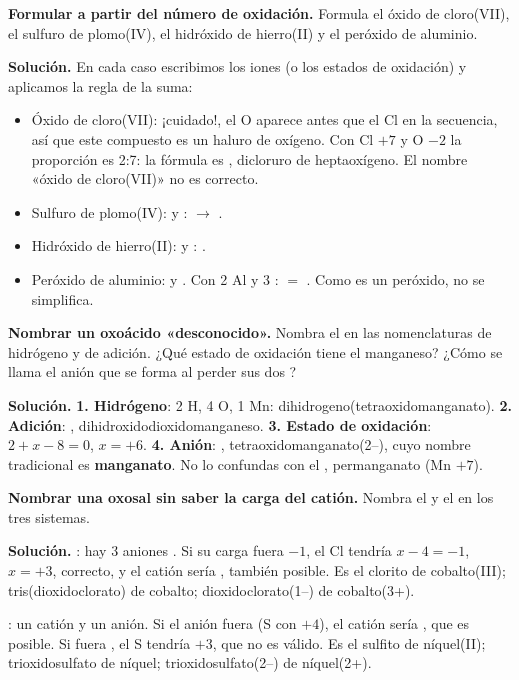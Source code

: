 \begin{example}
    \textbf{Formular a partir del número de oxidación.} Formula el óxido de cloro(VII), el sulfuro de plomo(IV), el hidróxido de
    hierro(II) y el peróxido de aluminio.

    \textbf{Solución.} En cada caso escribimos los iones (o los estados de oxidación) y aplicamos la regla de la suma:
    \begin{itemize}
        \item Óxido de cloro(VII): ¡cuidado!, el O aparece antes que el Cl en la secuencia, así que este compuesto es un haluro de
        oxígeno. Con Cl \(+7\) y O \(-2\) la proporción es 2:7: la fórmula es , dicloruro de heptaoxígeno. El nombre
        «óxido de cloro(VII)» no es correcto.
        \item Sulfuro de plomo(IV):  y :  \(\rightarrow\) .
        \item Hidróxido de hierro(II):  y : .
        \item Peróxido de aluminio:  y . Con 2 Al y 3 :  \(=\) . Como es un
        peróxido, no se simplifica.
    \end{itemize}
\end{example}

\begin{example}
    \textbf{Nombrar un oxoácido «desconocido».} Nombra el  en las nomenclaturas de hidrógeno y de adición. ¿Qué
    estado de oxidación tiene el manganeso? ¿Cómo se llama el anión que se forma al perder sus dos ?

    \textbf{Solución.} \textbf{1. Hidrógeno}: 2 H, 4 O, 1 Mn: dihidrogeno(tetraoxidomanganato). \textbf{2. Adición}:
    , dihidroxidodioxidomanganeso. \textbf{3. Estado de oxidación}: \(2 + x - 8 = 0\), \(x = +6\).
    \textbf{4. Anión}: , tetraoxidomanganato(2\nobreakdash--), cuyo nombre tradicional es \textbf{manganato}. No lo confundas con
    el , permanganato (Mn \(+7\)).
\end{example}

\begin{example}
    \textbf{Nombrar una oxosal sin saber la carga del catión.} Nombra el  y el  en los tres sistemas.

    \textbf{Solución.} \textbf{}: hay 3 aniones . Si su carga fuera \(-1\), el Cl tendría \(x - 4 = -1\),
    \(x = +3\), correcto, y el catión sería , también posible. Es el clorito de cobalto(III);
    tris(dioxidoclorato) de cobalto; dioxidoclorato(1\nobreakdash--) de cobalto(3+).

    \textbf{}: un catión y un anión. Si el anión fuera  (S con \(+4\)), el catión sería , que es
    posible. Si fuera , el S tendría \(+3\), que no es válido. Es el sulfito de níquel(II); trioxidosulfato de níquel;
    trioxidosulfato(2\nobreakdash--) de níquel(2+).
\end{example}

